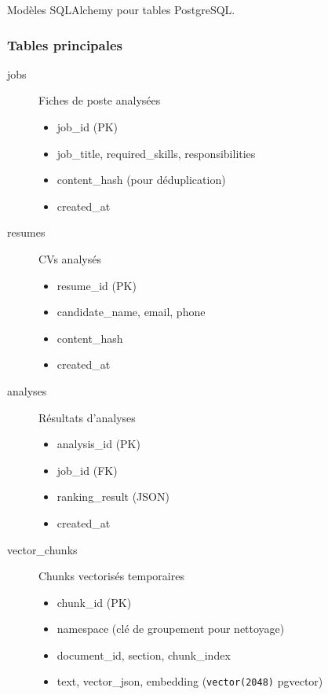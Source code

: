 \documentclass[12pt,a4paper,oneside]{book}
\begin{document}
Modèles SQLAlchemy pour tables PostgreSQL.

\subsubsection{Tables principales}

\begin{description}
    \item[jobs] Fiches de poste analysées
    \begin{itemize}
        \item job\_id (PK)
        \item job\_title, required\_skills, responsibilities
        \item content\_hash (pour déduplication)
        \item created\_at
    \end{itemize}
    
    \item[resumes] CVs analysés
    \begin{itemize}
        \item resume\_id (PK)
        \item candidate\_name, email, phone
        \item content\_hash
        \item created\_at
    \end{itemize}
    
    \item[analyses] Résultats d'analyses
    \begin{itemize}
        \item analysis\_id (PK)
        \item job\_id (FK)
        \item ranking\_result (JSON)
        \item created\_at
    \end{itemize}
    
    \item[vector\_chunks] Chunks vectorisés temporaires
    \begin{itemize}
        \item chunk\_id (PK)
        \item namespace (clé de groupement pour nettoyage)
        \item document\_id, section, chunk\_index
        \item text, vector\_json, embedding (\texttt{vector(2048)} pgvector)
    \end{itemize}
\end{description}
\end{document}
